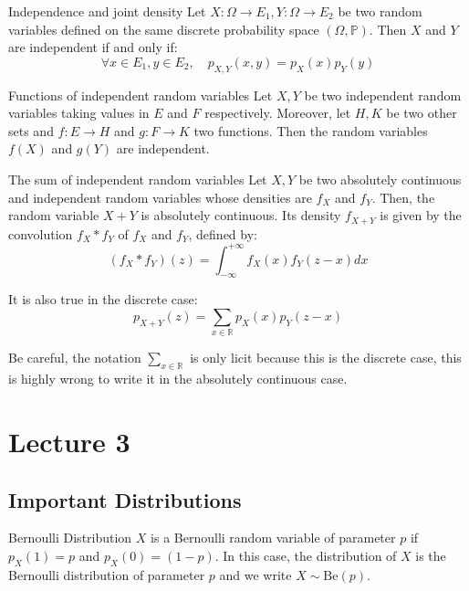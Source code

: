 \documentclass[11pt, a4paper]{article}
\begin{document}
\begin{proposition}{Independence and joint density}{}
Let $X: \Omega \rightarrow E_1, Y: \Omega \rightarrow E_2$ be two random variables defined on the same discrete probability space $(\Omega, \mathbb{P})$. Then $X$ and $Y$ are independent if and only if:
\[\forall x \in E_1, y \in E_2, \quad p_{X,Y}(x, y) = p_X(x)p_Y(y)\]

\end{proposition}

\begin{proposition}{Functions of independent random variables}{}
Let $X, Y$ be two independent random variables taking values in $E$ and $F$ respectively. Moreover, let $H, K$ be two other sets and $f: E \rightarrow H$ and $g: F \rightarrow K$ two functions. Then the random variables $f(X)$ and $g(Y)$ are independent.
\end{proposition}

\begin{proposition}{The sum of independent random variables}{}
Let $X, Y$ be two absolutely continuous and independent random variables whose densities are $f_X$ and $f_Y$. Then, the random variable $X+Y$ is absolutely continuous. Its density $f_{X+Y}$ is given by the convolution $f_X * f_Y$ of $f_X$ and $f_Y$, defined by:
\[(f_X * f_Y)(z) = \int_{-\infty}^{+\infty} f_X(x)f_Y(z-x) dx\]

It is also true in the discrete case:
\[p_{X+Y}(z) = \sum_{x \in \mathbb{R}} p_X(x)p_Y(z-x)\]

Be careful, the notation $\sum_{x \in \mathbb{R}}$ is only licit because this is the discrete case, this is highly wrong to write it in the absolutely continuous case.
\end{proposition}


\section{Lecture 3}

\subsection{Important Distributions}

\begin{definition}{Bernoulli Distribution}{}
$X$ is a Bernoulli random variable of parameter $p$ if $p_X(1) = p$ and $p_X(0) = (1 - p)$. In this case, the distribution of $X$ is the Bernoulli distribution of parameter $p$ and we write $X \sim \text{Be}(p)$.
\end{definition}
\end{document}
